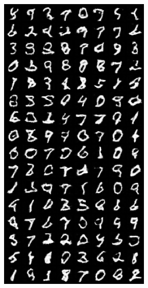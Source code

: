 \begin{figure}[H]
\begin{subfigure}{0.2\textwidth}
        \centering
        \includegraphics[width=0.95\linewidth]{GAN/fake_sample_epoch_0003.png}
        \caption{}
        \label{subfig:GAN/fake_sample_epoch_0003}
    \end{subfigure}%
    \begin{subfigure}{0.2\textwidth}
        \centering

\end{subfigure}
\end{figure}
